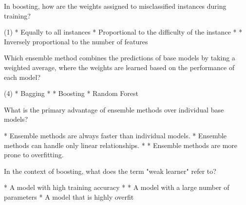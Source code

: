 \documentclass[11pt]{extarticle}
\begin{document}
\begin{exercise}
    In boosting, how are the weights assigned to misclassified instances during training?
    \begin{choice} (1)
        * Equally to all instances
        * Proportional to the difficulty of the instance
        * 
        * Inversely proportional to the number of features
    \end{choice}
\end{exercise}
\begin{solution}
\end{solution}

\begin{exercise}
    Which ensemble method combines the predictions of base models by taking a weighted average, where the weights are learned based on the performance of each model?
    \begin{choice}(4)
        * Bagging
        * 
        * Boosting
        * Random Forest
    \end{choice}
\end{exercise}
\begin{solution}
\end{solution}

\begin{exercise}
    What is the primary advantage of ensemble methods over individual base models?
    \begin{choice}
        * Ensemble methods are always faster than individual models.
        * Ensemble methods can handle only linear relationships.
        * 
        * Ensemble methods are more prone to overfitting.
    \end{choice}
\end{exercise}
\begin{solution}
\end{solution}

\begin{exercise}
    In the context of boosting, what does the term "weak learner" refer to?
    \begin{choice}
        * A model with high training accuracy
        * 
        * A model with a large number of parameters
        * A model that is highly overfit
    \end{choice}
\end{exercise}
\begin{solution}
\end{solution}
\end{document}
